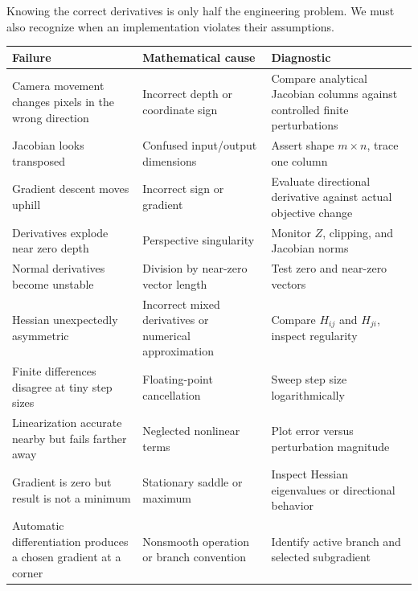 Knowing the correct derivatives is only half the engineering problem. We must also recognize when an implementation violates their assumptions.

{\def\LTcaptype{none} %
\begin{longtable}[]{@{}
  >{\raggedright\arraybackslash}p{}
  >{\raggedright\arraybackslash}p{}
  >{\raggedright\arraybackslash}p{}@{}}
\toprule\noalign{}
\begin{minipage}[b]{\linewidth}\raggedright
Failure
\end{minipage} & \begin{minipage}[b]{\linewidth}\raggedright
Mathematical cause
\end{minipage} & \begin{minipage}[b]{\linewidth}\raggedright
Diagnostic
\end{minipage} \\
\midrule\noalign{}
\endhead
\bottomrule\noalign{}
\endlastfoot
Camera movement changes pixels in the wrong direction & Incorrect depth or coordinate sign & Compare analytical Jacobian columns against controlled finite perturbations \\
Jacobian looks transposed & Confused input/output dimensions & Assert shape \(m\times n\), trace one column \\
Gradient descent moves uphill & Incorrect sign or gradient & Evaluate directional derivative against actual objective change \\
Derivatives explode near zero depth & Perspective singularity & Monitor \(Z\), clipping, and Jacobian norms \\
Normal derivatives become unstable & Division by near-zero vector length & Test zero and near-zero vectors \\
Hessian unexpectedly asymmetric & Incorrect mixed derivatives or numerical approximation & Compare \(H_{ij}\) and \(H_{ji}\), inspect regularity \\
Finite differences disagree at tiny step sizes & Floating-point cancellation & Sweep step size logarithmically \\
Linearization accurate nearby but fails farther away & Neglected nonlinear terms & Plot error versus perturbation magnitude \\
Gradient is zero but result is not a minimum & Stationary saddle or maximum & Inspect Hessian eigenvalues or directional behavior \\
Automatic differentiation produces a chosen gradient at a corner & Nonsmooth operation or branch convention & Identify active branch and selected subgradient \\
\end{longtable}
}

